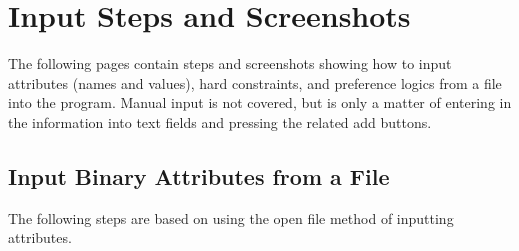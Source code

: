 \documentclass[12pt]{report}
\begin{document}
\section{Input Steps and Screenshots}
The following pages contain steps and screenshots showing how to input attributes (names and values), hard constraints, and preference logics from a file into the program. Manual input is not covered, but is only a matter of entering in the information into text fields and pressing the related add buttons.

\newpage
\subsection{Input Binary Attributes from a File}
The following steps are based on using the open file method of inputting attributes.\\
\end{document}
